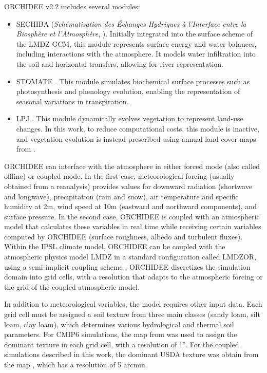 ORCHIDEE v2.2 includes several modules:
\begin{itemize}
    \item SECHIBA (\textit{Schématisation des Échanges Hydriques à l’Interface entre la Biosphère et l’Atmosphère}, \cite{ducoudre_sechiba_1993}). Initially integrated into the surface scheme of the LMDZ GCM, this module represents surface energy and water balances, including interactions with the atmosphere. It models water infiltration into the soil and horizontal transfers, allowing for river representation.
    \item STOMATE \citep{krinner_dynamic_2005}. This module simulates biochemical surface processes such as photosynthesis and phenology evolution, enabling the representation of seasonal variations in transpiration.
    \item LPJ \citep{sitch_evaluation_2003}. This module dynamically evolves vegetation to represent land-use changes. In this work, to reduce computational costs, this module is inactive, and vegetation evolution is instead prescribed using annual land-cover maps from \cite{belward1999igbp}.
\end{itemize}

ORCHIDEE can interface with the atmosphere in either forced mode (also called offline) or coupled mode. 
In the first case, meteorological forcing (usually obtained from a reanalysis) provides values for downward radiation (shortwave and longwave), precipitation (rain and snow), air temperature and specific humidity at 2m, wind speed at 10m (eastward and northward components), and surface pressure. 
In the second case, ORCHIDEE is coupled with an atmospheric model that calculates these variables in real time while receiving certain variables computed by ORCHIDEE (surface roughness, albedo and turbulent fluxes). 
Within the IPSL climate model, ORCHIDEE can be coupled with the atmospheric physics model LMDZ in a standard configuration called LMDZOR, using a semi-implicit coupling scheme \cite{polcher_proposal_1998}. %
ORCHIDEE discretizes the simulation domain into grid cells, with a resolution that adapts to the atmospheric forcing or the grid of the coupled atmospheric model.

In addition to meteorological variables, the model requires other input data. Each grid cell must be assigned a soil texture from three main classes (sandy loam, silt loam, clay loam), which determines various hydrological and thermal soil parameters. 
For CMIP6 simulations, the map from \cite{zobler87802world} was used to assign the dominant  texture in each grid cell, with a resolution of 1°. For the coupled simulations described in this work, the dominant USDA texture was obtain from the map \cite{reynolds_estimating_2000}, which has a resolution of 5 arcmin.

